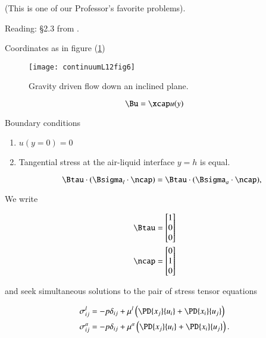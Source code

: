 (This is one of our Professor's favorite problems).

Reading: \S 2.3 from \cite{acheson1990elementary}.

Coordinates as in figure (\ref{fig:continuumL12:continuumL12fig6})
\begin{figure}[htp]
   \centering
   \texttt{[image: continuumL12fig6]}
   \caption{Gravity driven flow down an inclined plane.}\label{fig:continuumL12:continuumL12fig6}
\end{figure}

\begin{equation}\label{eqn:continuumL12:150}
\Bu = \xcap u(y)
\end{equation}

Boundary conditions

\begin{enumerate}
\item $u(y = 0) = 0$
\item Tangential stress at the air-liquid interface $y = h$ is equal.

\begin{equation}\label{eqn:continuumL12:170}
\Btau \cdot (\Bsigma_l \cdot \ncap) = \Btau \cdot (\Bsigma_a \cdot \ncap),
\end{equation}
\end{enumerate}

We write

\begin{align}\label{eqn:continuumL12:190}
\Btau &=
\begin{bmatrix}
1 \\
0 \\
0
\end{bmatrix} \\
\ncap &=
\begin{bmatrix}
0 \\
1 \\
0
\end{bmatrix}
\end{align}

and seek simultaneous solutions to the pair of stress tensor equations

\begin{align}\label{eqn:continuumL12:210}
\sigma_{ij}^l
&= - p \delta_{ij} + \mu^l \left(
\PD{x_j}{u_i} +
\PD{x_i}{u_j}
\right) \\
\sigma_{ij}^a
&= - p \delta_{ij} + \mu^a \left(
\PD{x_j}{u_i} +
\PD{x_i}{u_j}
\right).
\end{align}

